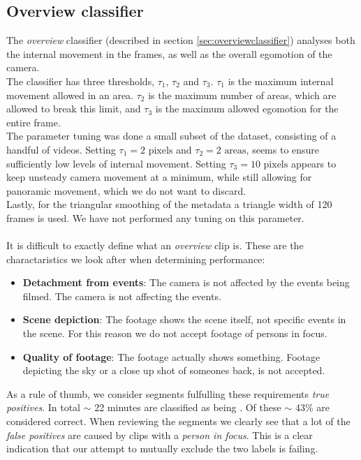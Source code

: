 \subsection{Overview classifier}
%
The \textit{overview} classifier (described in section \ref{sec:overviewclassifier}) analyses both the internal movement in the frames, as well as the overall egomotion of the camera.\\
The classifier has three thresholds, $\tau_{1}$, $\tau_{2}$ and $\tau_{3}$. $\tau_{1}$ is the maximum internal movement allowed in an area. $\tau_{2}$ is the maximum number of areas, which are allowed to break this limit, and $\tau_{3}$ is the maximum allowed egomotion for the entire frame.\\
The parameter tuning was done a small subset of the dataset, consisting of a handful of videos. Setting $\tau_{1} = 2 \text{ pixels}$ and $\tau_{2} = 2 \text{ areas}$, seems to ensure sufficiently low levels of internal movement. Setting $\tau_{3} = 10 \text{ pixels}$ appears to keep unsteady camera movement at a minimum, while still allowing for panoramic movement, which we do not want to discard.\\
Lastly, for the triangular smoothing of the metadata a triangle width of 120 frames is used. We have not performed any tuning on this parameter.\\
\\
It is difficult to exactly define what an \textit{overview} clip is. These are the charactaristics we look after when determining performance:
%
\begin{itemize}
	\item \textbf{Detachment from events}: The camera is not affected by the events being filmed. The camera is not affecting the events.
	\item \textbf{Scene depiction}: The footage shows the scene itself, not specific events in the scene. For this reason we do not accept footage of persons in focus.
	\item \textbf{Quality of footage}: The footage actually shows something. Footage depicting the sky or a close up shot of someones back, is not accepted.
\end{itemize}
%
As a rule of thumb, we consider segments fulfulling these requirements \textit{true positives}. In total $\sim$ 22 minutes are classified as being . Of these $\sim$ 43\% are considered correct. When reviewing the segments we clearly see that a lot of the \textit{false positives} are caused by clips with a \textit{person in focus}. This is a clear indication that our attempt to mutually exclude the two labels is failing.
%
